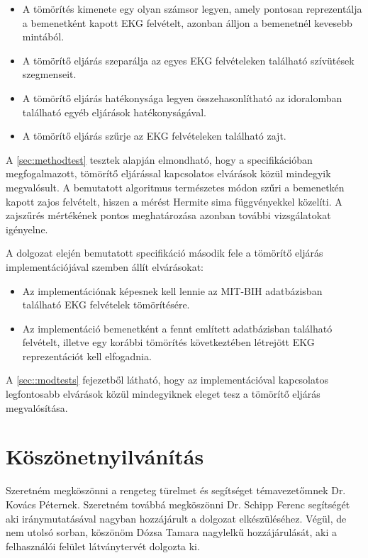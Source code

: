 \documentclass[oneside,titlepage,12pt,a4paper]{report}
\begin{document}
\begin{itemize}
\item A tömörítés kimenete egy olyan számsor legyen, amely pontosan reprezentálja a bemenetként kapott EKG felvételt, azonban álljon a bemenetnél kevesebb mintából.
\item A tömörítő eljárás szeparálja az egyes EKG felvételeken található szívütések szegmenseit. 
\item A tömörítő eljárás hatékonysága legyen összehasonlítható az idoralomban található egyéb eljárások hatékonyságával. 
\item A tömörítő eljárás szűrje az EKG felvételeken található zajt.
\end{itemize}

A \ref{sec:methodtest} tesztek alapján elmondható, hogy a specifikációban megfogalmazott, tömörítő eljárással kapcsolatos elvárások közül mindegyik megvalósult. A bemutatott algoritmus természetes módon szűri a bemenetkén kapott zajos felvételt, hiszen a mérést Hermite sima függvényekkel közelíti. A zajszűrés mértékének pontos meghatározása azonban további vizsgálatokat igényelne. 
\par A dolgozat elején bemutatott specifikáció második fele a tömörítő eljárás implementációjával szemben állít elvárásokat:

\begin{itemize}
\item Az implementációnak képesnek kell lennie az MIT-BIH adatbázisban található EKG felvételek tömörítésére. 
\item Az implementáció bemenetként a fennt említett adatbázisban található felvételt, illetve egy korábbi tömörítés következtében létrejött EKG reprezentációt kell elfogadnia.
\end{itemize} 

A \ref{sec::modtests} fejezetből látható, hogy az implementációval kapcsolatos legfontosabb elvárások közül mindegyiknek eleget tesz a tömörítő eljárás megvalósítása.  

\chapter{Köszönetnyilvánítás}

Szeretném megköszönni a rengeteg türelmet és segítséget témavezetőmnek Dr. Kovács Péternek. Szeretném továbbá megköszönni Dr. Schipp Ferenc segítségét aki iránymutatásával nagyban hozzájárult a dolgozat elkészüléséhez. Végül, de nem utolsó sorban, köszönöm Dózsa Tamara nagylelkű hozzájárulását, aki a felhasználói felület látványtervét dolgozta ki.  
\end{document}
